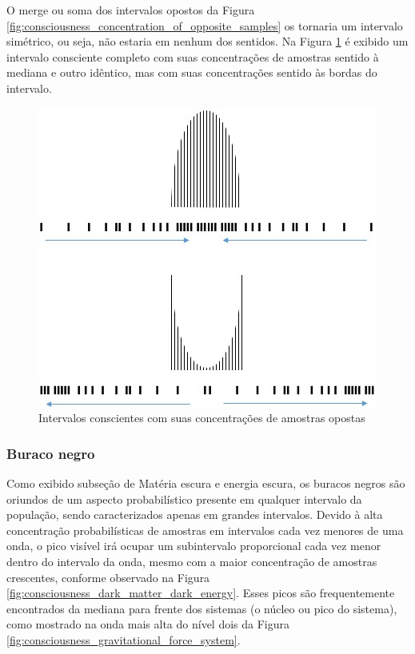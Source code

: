 O merge ou soma dos intervalos opostos da Figura \ref{fig:consciousness_concentration_of_opposite_samples} os tornaria um intervalo simétrico, ou seja, não estaria em nenhum dos sentidos.
Na Figura \ref{fig:consciousness_concentration_of_opposite_samples_within_range} é exibido um intervalo consciente completo com suas concentrações de amostras sentido à mediana e outro idêntico, mas com suas concentrações sentido às bordas do intervalo.
	\begin{figure}[H]
	\caption{Intervalos conscientes com suas concentrações de amostras opostas}
	\label{fig:consciousness_concentration_of_opposite_samples_within_range}
	\centering
	\includegraphics[scale=.7]{sections/images/consciousness_concentration_of_opposite_samples_within_range.jpg}
	\end{figure}

\subsubsection{Buraco negro}
Como exibido subseção de Matéria escura e energia escura, os buracos negros são oriundos de um aspecto probabilístico presente em qualquer intervalo da população, sendo caracterizados apenas em grandes intervalos. Devido à alta concentração probabilísticas de amostras em intervalos cada vez menores de uma onda, o pico visível irá ocupar um subintervalo proporcional cada vez menor dentro do intervalo da onda, mesmo com a maior concentração de amostras crescentes, conforme observado na Figura \ref{fig:consciousness_dark_matter_dark_energy}. Esses picos são frequentemente encontrados da mediana para frente dos sistemas (o núcleo ou pico do sistema), como mostrado na onda mais alta do nível dois da Figura \ref{fig:consciousness_gravitational_force_system}.

